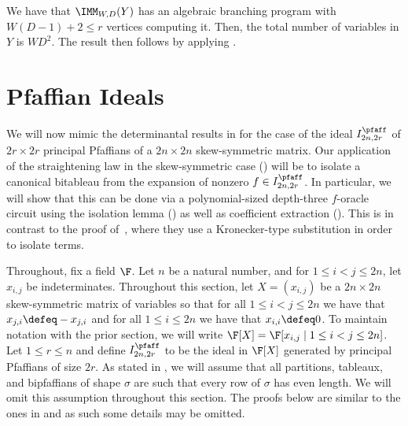 \documentclass[letterpaper, 11pt]{amsart}
\begin{document}
\begin{pf}
    We have that $\IMM_{W, D}(Y)$ has an algebraic branching program with $W(D-1) + 2 \leq r$ vertices computing it.
    Then, the total number of variables in $Y$ is $WD^2$.
    The result then follows by applying .
\end{pf} 

\section{Pfaffian Ideals}\label{sec:pfaff}

We will now mimic the determinantal results in  for the case of the ideal $I^{\pfaff}_{2n, 2r}$ of $2r \times 2r$ principal Pfaffians of a $2n \times 2n$ skew-symmetric matrix.
Our application of the straightening law in the skew-symmetric case () will be to isolate a canonical bitableau from the expansion of nonzero $f \in I^{\pfaff}_{2n, 2r}$.
In particular, we will show that this can be done via a polynomial-sized depth-three $f$-oracle circuit using the isolation lemma () as well as coefficient extraction ().
This is in contrast to the proof of~\cite{AF21}, where they use a Kronecker-type substitution in order to isolate terms.

Throughout, fix a field $\F$.
Let $n$ be a natural number, and for $1 \leq i < j \leq 2n$, let $x_{i, j}$ be indeterminates.
Throughout this section, let $X = (x_{i, j})$ be a $2n \times 2n$ skew-symmetric matrix of variables so that for all $1 \leq i < j \leq 2n$ we have that $x_{j, i} \defeq -x_{j, i}$ and for all $1 \leq i \leq 2n$ we have that $x_{i, i} \defeq 0$.
To maintain notation with the prior section, we will write $\F[X] = \F[x_{i, j} \mid 1 \leq i < j \leq 2n]$.
Let $1 \leq r \leq n$ and define $I^{\pfaff}_{2n, 2r}$ to be the ideal in $\F[X]$ generated by principal Pfaffians of size $2r$.
As stated in , we will assume that all partitions, tableaux, and bipfaffians of shape $\sigma$ are such that every row of $\sigma$ has even length.
We will omit this assumption throughout this section.
The proofs below are similar to the ones in  and as such some details may be omitted.
\end{document}
